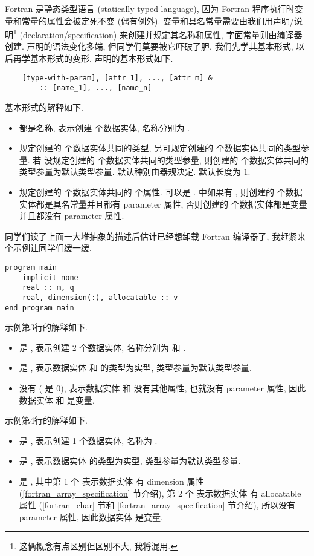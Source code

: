 Fortran 是静态类型语言 (statically typed language), 因为 Fortran 程序执行时变量和常量的属性会被定死不变 (偶有例外). 变量和具名常量需要由我们用声明/说明\footnote{这俩概念有点区别但区别不大, 我将混用.} (declaration/specification) 来创建并规定其名称和属性, 字面常量则由编译器创建. 声明的语法变化多端, 但同学们莫要被它吓破了胆, 我们先学其基本形式, 以后再学基本形式的变形. 声明的基本形式如下.
\begin{verbatim}
    [type-with-param], [attr_1], ..., [attr_m] &
        :: [name_1], ..., [name_n]
\end{verbatim}
基本形式的解释如下.
\begin{itemize}
    \item {} 都是名称, 表示创建  个数据实体, 名称分别为 .
    \item {} 规定创建的  个数据实体共同的类型, 另可规定创建的  个数据实体共同的类型参量. 若  没规定创建的  个数据实体共同的类型参量, 则创建的  个数据实体共同的类型参量为默认类型参量. 默认种别由器规决定. 默认长度为 $1$.
    \item {} 规定创建的  个数据实体共同的  个属性.  可以是 .  中如果有 , 则创建的  个数据实体都是具名常量并且都有 parameter 属性, 否则创建的  个数据实体都是变量并且都没有 parameter 属性.
\end{itemize}
同学们读了上面一大堆抽象的描述后估计已经想卸载 Fortran 编译器了, 我赶紧来个示例让同学们缓一缓. 
\begin{lstlisting}
program main
    implicit none
    real :: m, q
    real, dimension(:), allocatable :: v
end program main
\end{lstlisting}
示例第3行的解释如下.
\begin{itemize}
    \item {} 是 , 表示创建 2 个数据实体, 名称分别为  和 .
    \item {} 是 , 表示数据实体  和  的类型为实型, 类型参量为默认类型参量.
    \item {} 没有 ( 是 0), 表示数据实体  和  没有其他属性, 也就没有 parameter 属性, 因此数据实体  和 是变量.
\end{itemize}
示例第4行的解释如下.
\begin{itemize}
    \item {} 是 , 表示创建 1 个数据实体, 名称为 .
    \item {} 是 , 表示数据实体  的类型为实型, 类型参量为默认类型参量.
    \item {} 是 , 其中第 1 个  表示数据实体  有 dimension 属性 (\ref{fortran_array_specification} 节介绍), 第 2 个  表示数据实体  有 allocatable 属性 (\ref{fortran_char} 节和 \ref{fortran_array_specification} 节介绍), 所以没有 parameter 属性, 因此数据实体  是变量.
\end{itemize}
